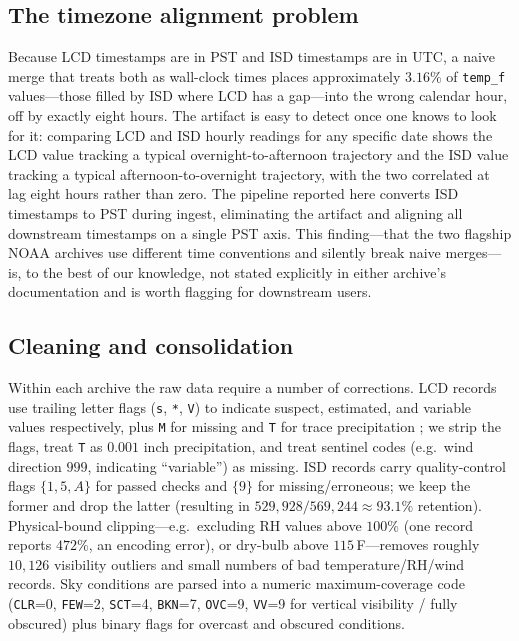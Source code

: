 \documentclass[11pt]{article}
\begin{document}
\subsection{The timezone alignment problem}

Because LCD timestamps are in PST and ISD timestamps are in UTC, a naive
merge that treats both as wall-clock times places approximately
$3.16\%$ of \texttt{temp\_f} values---those filled by ISD where LCD has a
gap---into the wrong calendar hour, off by exactly eight hours. The artifact
is easy to detect once one knows to look for it: comparing LCD and ISD
hourly readings for any specific date shows the LCD value tracking a typical
overnight-to-afternoon trajectory and the ISD value tracking a typical
afternoon-to-overnight trajectory, with the two correlated at lag eight
hours rather than zero. The pipeline reported here converts ISD timestamps
to PST during ingest, eliminating the artifact and aligning all downstream
timestamps on a single PST axis. This finding---that the two flagship
NOAA archives use different time conventions and silently break naive
merges---is, to the best of our knowledge, not stated explicitly in
either archive's documentation and is worth flagging for downstream users.

\subsection{Cleaning and consolidation}

Within each archive the raw data require a number of corrections.
LCD records use trailing letter flags (\texttt{s}, \texttt{*}, \texttt{V})
to indicate suspect, estimated, and variable values respectively, plus
\texttt{M} for missing and \texttt{T} for trace precipitation
\citep{noaalcd}; we strip the flags, treat \texttt{T} as $0.001$ inch
precipitation, and treat sentinel codes (e.g.\ wind direction $999$,
indicating ``variable'') as missing.
ISD records carry quality-control flags
$\{1, 5, A\}$ for passed checks and $\{9\}$ for missing/erroneous; we keep
the former and drop the latter (resulting in $529{,}928 / 569{,}244 \approx
93.1\%$ retention). Physical-bound clipping---e.g.\ excluding RH values
above $100\%$ (one record reports $472\%$, an encoding error), or dry-bulb
above $115$\,\textdegree F---removes roughly $10{,}126$ visibility outliers
and small numbers of bad temperature/RH/wind records. Sky conditions are
parsed into a numeric maximum-coverage code (\texttt{CLR}=0, \texttt{FEW}=2,
\texttt{SCT}=4, \texttt{BKN}=7, \texttt{OVC}=9, \texttt{VV}=9 for vertical
visibility / fully obscured) plus binary flags for overcast and obscured
conditions.
\end{document}
